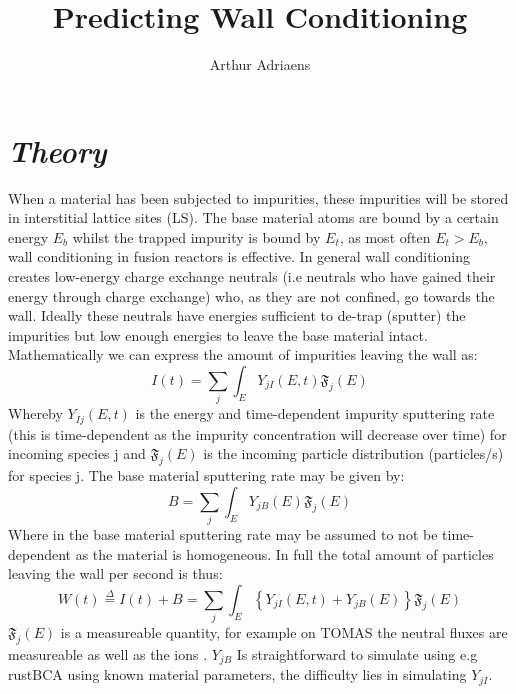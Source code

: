 \documentclass{article}
\title{Predicting Wall Conditioning}
\author{Arthur Adriaens}
\begin{document}
\maketitle
\section*{\textit{Theory}}
When a material has been subjected to impurities, these impurities will be
stored in interstitial lattice sites  (LS). The base material atoms are bound by a
certain energy $E_b$ whilst the trapped impurity is bound by $E_t$, as most
often $E_t>E_b$, wall conditioning in fusion reactors is effective.  In general
wall conditioning creates low-energy charge exchange neutrals (i.e neutrals who
have gained their energy through charge exchange) who, as they are not
confined, go towards the wall. Ideally these neutrals have energies sufficient
to de-trap (sputter) the impurities but low enough energies to leave the base
material intact.  Mathematically we can express the amount of impurities
leaving the wall as:
\begin{equation}
    I(t) = \sum_j\int_E Y_{jI}(E,t)\mathfrak{F}_j(E)
\end{equation}
Whereby $Y_{Ij}(E,t)$ is the energy and time-dependent impurity sputtering rate
(this is time-dependent as the impurity concentration will decrease over time)
for incoming species j and $\mathfrak{F}_j(E)$ is the incoming particle
distribution (particles/s) for species j.  The base material sputtering rate
may be given by:
\begin{equation}
    B = \sum_j\int_E Y_{jB}(E)\mathfrak{F}_j(E)
\end{equation}
Where in the base material sputtering rate may be assumed to not be
time-dependent as the material is homogeneous.  In full the total amount of
particles leaving the wall per second is thus:
\begin{equation}
    W(t) \stackrel{\Delta}{=} I(t) + B = \sum_j \int_E \left\{ Y_{jI}(E,t) + Y_{jB}(E) \right\} \mathfrak{F}_j(E)
\end{equation}
$\mathfrak{F}_j(E)$ is a measureable quantity, for example on TOMAS the neutral
fluxes are measureable \cite{DanielNPA} as well as the ions \cite{AndreiRFEA}.
$Y_{jB}$ Is straightforward to simulate using e.g rustBCA using known
material parameters, the difficulty lies in simulating $Y_{jI}$.
\end{document}
